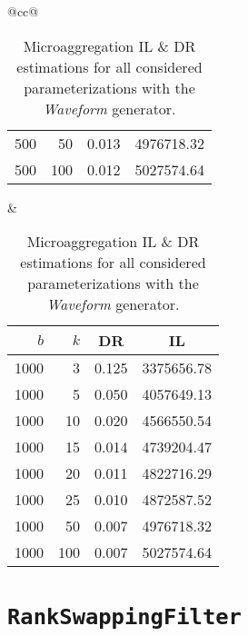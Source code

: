 \begin{table}[H]
\begin{tabular}{@{}cc@{}}
\begin{tabular}{@{}rrrr@{}}
			500  & 50  & 0.013 & 4976718.32 \\
			500  & 100 & 0.012 & 5027574.64 \\ \bottomrule
		\end{tabular}
		&
		\begin{tabular}{@{}rrrr@{}}
			\toprule
			$b$ & $k$ & \multicolumn{1}{c}{DR} & \multicolumn{1}{c}{IL} \\ \midrule
			1000 & 3   & 0.125 & 3375656.78 \\
			1000 & 5   & 0.050 & 4057649.13 \\
			1000 & 10  & 0.020 & 4566550.54 \\
			1000 & 15  & 0.014 & 4739204.47 \\
			1000 & 20  & 0.011 & 4822716.29 \\
			1000 & 25  & 0.010 & 4872587.52 \\
			1000 & 50  & 0.007 & 4976718.32 \\
			1000 & 100 & 0.007 & 5027574.64 \\ \bottomrule
		\end{tabular}
	\end{tabular}
	\caption[Microaggregation DR \& IL estimations (Waveform).]{Microaggregation IL \& DR estimations for all considered parameterizations with the \textit{Waveform} generator.}
\end{table}

\section*{\texttt{RankSwappingFilter}}

